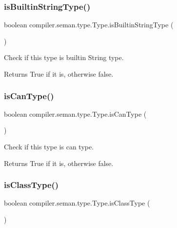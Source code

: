 \subsubsection{\texorpdfstring{is\+Builtin\+String\+Type()}{isBuiltinStringType()}}
{\footnotesize\ttfamily boolean compiler.\+seman.\+type.\+Type.\+is\+Builtin\+String\+Type (\begin{DoxyParamCaption}{ }\end{DoxyParamCaption})}

Check if this type is builtin String type. \begin{DoxyReturn}{Returns}
True if it is, otherwise false. 
\end{DoxyReturn}
\mbox{\label{classcompiler_1_1seman_1_1type_1_1_type_a7cb5e946db382ef23bc2e6c36c8f78b2}} 
\subsubsection{\texorpdfstring{is\+Can\+Type()}{isCanType()}}
{\footnotesize\ttfamily boolean compiler.\+seman.\+type.\+Type.\+is\+Can\+Type (\begin{DoxyParamCaption}{ }\end{DoxyParamCaption})}

Check if this type is can type. \begin{DoxyReturn}{Returns}
True if it is, otherwise false. 
\end{DoxyReturn}
\mbox{\label{classcompiler_1_1seman_1_1type_1_1_type_a3835ea547dbb5a3bb1b66b85067c4787}} 
\subsubsection{\texorpdfstring{is\+Class\+Type()}{isClassType()}}
{\footnotesize\ttfamily boolean compiler.\+seman.\+type.\+Type.\+is\+Class\+Type (\begin{DoxyParamCaption}{ }\end{DoxyParamCaption})}

